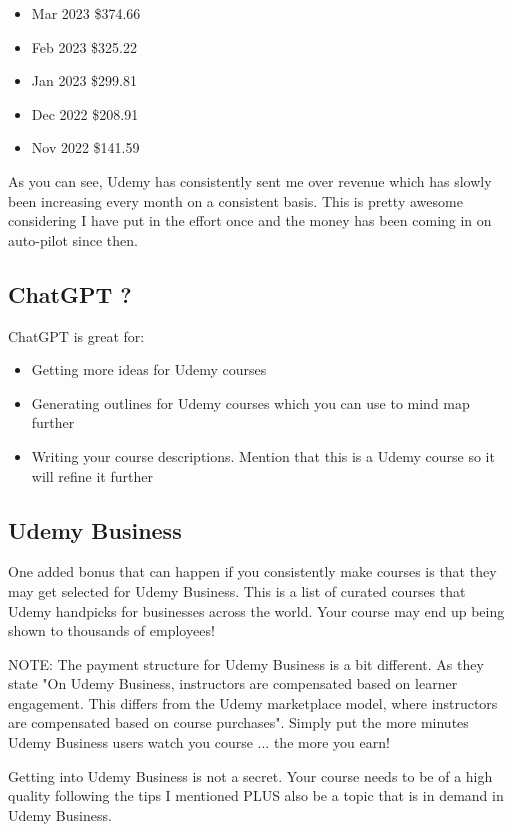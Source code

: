 \documentclass[11pt]{article}
\begin{document}
\begin{itemize}
\item Mar 2023 \$374.66
\item Feb 2023 \$325.22
\item Jan 2023 \$299.81
\item Dec 2022 \$208.91
\item Nov 2022 \$141.59
\end{itemize}

As you can see, Udemy has consistently sent me over revenue which has slowly been increasing every month on a consistent basis. This is pretty awesome considering I have put in the effort once and the money has been coming in on auto-pilot since then.

\subsection*{ChatGPT ?}
ChatGPT is great for:

\begin{itemize}
\item Getting more ideas for Udemy courses
\item Generating outlines for Udemy courses which you can use to mind map further
\item Writing your course descriptions. Mention that this is a Udemy course so it will refine it further
\end{itemize}

\subsection*{Udemy Business}
One added bonus that can happen if you consistently make courses is that they may get selected for Udemy Business. This is a list of curated courses that Udemy handpicks for businesses across the world. Your course may end up being shown to thousands of employees!

NOTE: The payment structure for Udemy Business is a bit different. As they state "On Udemy Business, instructors are compensated based on learner engagement. This differs from the Udemy marketplace model, where instructors are compensated based on course purchases". Simply put the more minutes Udemy Business users watch you course ... the more you earn!

Getting into Udemy Business is not a secret. Your course needs to be of a high quality following the tips I mentioned PLUS also be a topic that is in demand in Udemy Business.
\end{document}
